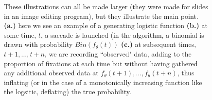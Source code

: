 \documentclass{article}
\begin{document}
\begin{figure}
    \centering
    \caption{These illustrations can all be made larger (they were made for slides in an image editing program), but they illustrate the main point. \textbf{(a.)} here we see an example of a generating logistic function \textbf{(b.)} at some time, $t$, a saccade is launched (in the algorithm, a binomial is drawn with probability $Bin(f_{\theta}(t))$ \textbf{(c.)} at subsequent times, $t+1, \dots, t+n$, we are recording ``observed" data, adding to the proportion of fixations at each time but without having gathered any additional observed data at $f_{\theta}(t+1), \dots,f_{\theta}(t+n)$, thus inflating (or in the case of a monotonically increasing function like the logsitic, deflating) the true probability. }
\label{fig:folly_of_fixation}
\end{figure}



\end{document}
